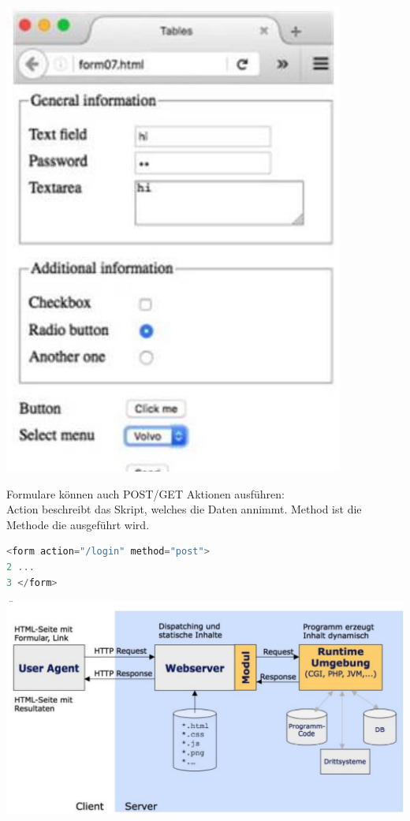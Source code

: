 \begin{center}
\includegraphics[width=\linewidth]{images/2024_12_29_858f09cde51177c71657g-29}
\end{center}

Formulare können auch POST/GET Aktionen ausführen:\\
Action beschreibt das Skript, welches die Daten annimmt. Method ist die Methode die ausgeführt wird.

\begin{lstlisting}[language=JavaScript, style=basesmol]
<form action="/login" method="post">
2 ...
3 </form>
\end{lstlisting}

\begin{center}
\includegraphics[width=\linewidth]{images/2024_12_29_858f09cde51177c71657g-29(1)}
\end{center}

